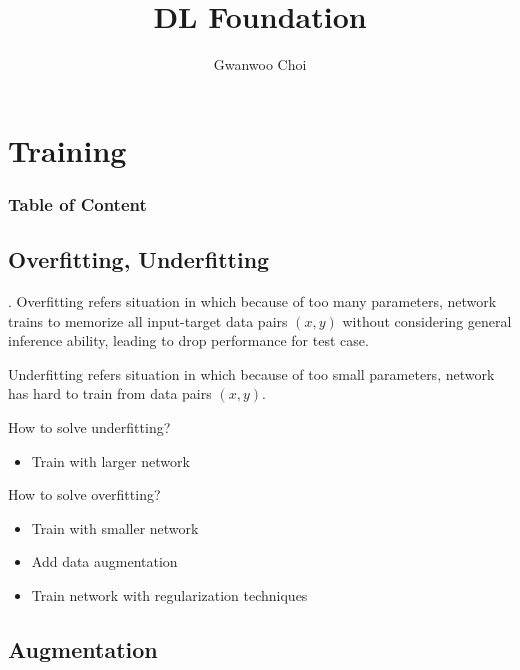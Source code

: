 \documentclass[8pt]{beamer}
\title{DL Foundation}
\author{Gwanwoo Choi}
\begin{document}
\begin{frame}
    \titlepage
\end{frame}

\section{Training}
\begingroup
    \begin{frame}
        \frametitle{Table of Content}
        \tableofcontents
    \end{frame}
\endgroup
\subsection{Overfitting, Underfitting}
\begin{frame}{.}
    Overfitting refers situation in which because of too many parameters, network trains to memorize all input-target data pairs $(x,y)$ without considering general inference ability, leading to drop performance for test case.

    Underfitting refers situation in which because of too small parameters, network has hard to train from data pairs $(x,y)$.


    \begin{block}{How to solve underfitting?}
        \begin{itemize}
            \item Train with larger network
        \end{itemize}
    \end{block}

    \begin{block}{How to solve overfitting?}
        \begin{itemize}
            \item Train with smaller network
            \item Add data augmentation
            \item Train network with regularization techniques
        \end{itemize}
    \end{block}
\end{frame}

\subsection{Augmentation}
\end{document}
